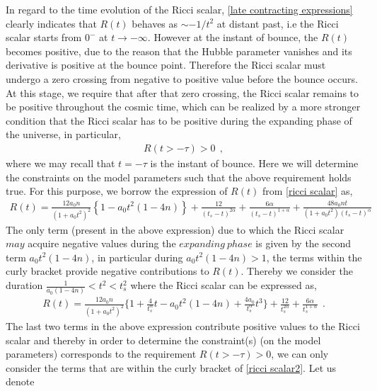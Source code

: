 \documentclass{article}
\begin{document}
In regard to the time evolution of the Ricci scalar, \ref{late contracting expressions} clearly indicates that $R(t)$ behaves as $\sim -1/t^2$ 
at distant past, i.e the Ricci scalar starts from $0^{-}$ at $t \rightarrow -\infty$. However at the instant of bounce, the $R(t)$ becomes positive, 
due to the reason that the Hubble parameter vanishes and its derivative is positive at the bounce point. Therefore the Ricci scalar 
must undergo a zero crossing from negative to positive value before the bounce occurs. At this stage, 
we require that after that zero crossing, the Ricci scalar 
remains to be positive throughout the cosmic time, which can be realized by a more stronger condition that the Ricci scalar has to be positive 
during the expanding phase of the universe, in particular,
\begin{eqnarray}
 R(t > -\tau) > 0~~,
 \label{requirement1}
\end{eqnarray}
where we may recall that $t = -\tau$ is the instant of bounce. 
Here we will determine the constraints on the model parameters such that the above requirement holds true. For this purpose, we borrow the expression 
of $R(t)$ from \ref{ricci scalar} as,
\begin{eqnarray}
 R(t) = \frac{12a_0n}{\left(1 + a_0t^2\right)^2}\left\{1 - a_0t^2\left(1-4n\right)\right\} 
 + \frac{12}{\left(t_s - t\right)^{2\alpha}} + \frac{6\alpha}{\left(t_s - t\right)^{1+\alpha}} + \frac{48a_0nt}{\left(1 + a_0t^2\right)
 \left(t_s - t\right)^{\alpha}}
 \label{ricci scalar1}
\end{eqnarray}
The only term (present in the above expression) due to which the Ricci scalar $may$ acquire negative values during the $expanding~phase$ is given by 
the second term $a_0t^2\left(1 - 4n\right)$, in particular during $a_0t^2\left(1 - 4n\right) > 1$, the terms within the curly bracket 
provide negative contributions to $R(t)$. Thereby we consider the duration $\frac{1}{a_0(1-4n)} < t^2 < t_s^2$ where 
the Ricci scalar can be expressed as,
\begin{eqnarray}
 R(t) = \frac{12a_0n}{\left(1 + a_0t^2\right)^2}\bigg\{1 + \frac{4}{t_s^{\alpha}}t - a_0t^2\left(1 - 4n\right) + \frac{4a_0}{t_s^{\alpha}}t^3\bigg\} 
 + \frac{12}{t_s^{2\alpha}} + \frac{6\alpha}{t_s^{1+\alpha}}~~.
 \label{ricci scalar2}
\end{eqnarray}
The last two terms in the above expression contribute positive values to the Ricci scalar and 
thereby in order to determine the constraint(s) (on the model parameters) 
corresponds to the requirement $R(t > -\tau) > 0$, we can only consider the terms that are within the curly bracket of \ref{ricci scalar2}. Let us denote 
\end{document}
